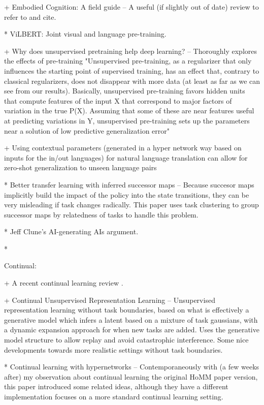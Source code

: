 + Embodied Cognition: A field guide -- A useful (if slightly out of date) review to refer to and cite. \citep{Anderson2003}

* ViLBERT: Joint visual and language pre-training. \citep{Lu2019}

+ Why does unsupervised pretraining help deep learning? -- Thoroughly explores the effects of pre-training
"Unsupervised pre-training, as a regularizer that only influences the starting point of
supervised training, has an effect that, contrary to classical regularizers, does not disappear with
more data (at least as far as we can see from our results). Basically, unsupervised pre-training favors
hidden units that compute features of the input X that correspond to major factors of variation in
the true P(X). Assuming that some of these are near features useful at predicting variations in Y,
unsupervised pre-training sets up the parameters near a solution of low predictive generalization error" \citep{Erhan2010}

+ Using contextual parameters (generated in a hyper network way based on inputs for the in/out languages) for natural language translation can allow for zero-shot generalization to unseen language pairs \citep{Platanios2017}

* Better transfer learning with inferred successor maps -- Because succesor maps implicitly build the impact of the policy into the state transitions, they can be very misleading if task changes radically. This paper uses task clustering to group successor maps by relatedness of tasks to handle this problem. \citep{Madarasz2019}

* Jeff Clune's AI-generating AIs argument. \citep{Clune2019}

*




Continual:

+ A recent continual learning review \citep{Parisi2019}.

+ Continual Unsupervised Representation Learning -- Unsupervised representation learning without task boundaries, based on what is effectively a generative model which infers a latent based on a mixture of task gaussians, with a dynamic expansion approach for when new tasks are added. Uses the generative model structure to allow replay and avoid catastrophic interference. Some nice developments towards more realistic settings without task boundaries. \citep{Rao2019}

* Continual learning with hypernetworks -- Contemporaneously with (a few weeks after) my observation about continual learning the original HoMM paper version, this paper introduced some related ideas, although they have a different implementation focuses on a more standard continual learning setting. \citep{Oswald2020}

